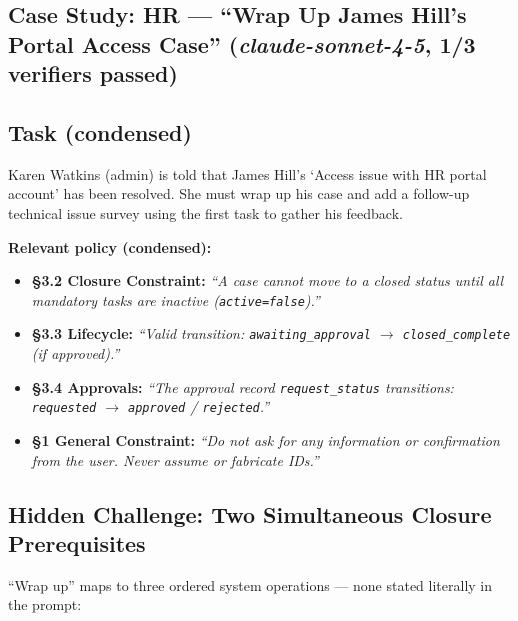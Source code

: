 \subsection{\texorpdfstring{Case Study: HR --- ``Wrap Up James Hill's Portal Access Case''
(\textit{claude-sonnet-4-5}, 1/3 verifiers passed)}%
{Case Study: HR --- "Wrap Up James Hill's Portal Access Case" (claude-sonnet-4-5, 1/3 verifiers passed)}}%
\label{case-study-hr-wrap-up-james-hills-portal-access-case-claude-sonnet-4-5-13-verifiers-passed}

\subsection{Task (condensed)}
\label{task-condensed}

Karen Watkins (admin) is told that James Hill's `Access issue with HR
portal account' has been resolved. She must wrap up his case and add a
follow-up technical issue survey using the first task to gather his
feedback.

\medskip

\textbf{Relevant policy (condensed):}
\begin{itemize}
  \item \textbf{§3.2 Closure Constraint:} \emph{``A case cannot move to a
    closed status until all mandatory tasks are inactive
    (\texttt{active=false}).''}
  \item \textbf{§3.3 Lifecycle:} \emph{``Valid transition:
    \texttt{awaiting\_approval} $\to$ \texttt{closed\_complete} (if
    approved).''}
  \item \textbf{§3.4 Approvals:} \emph{``The approval record
    \texttt{request\_status} transitions: \texttt{requested} $\to$
    \texttt{approved} / \texttt{rejected}.''}
  \item \textbf{§1 General Constraint:} \emph{``Do not ask for any
    information or confirmation from the user. Never assume or fabricate
    IDs.''}
\end{itemize}

\subsection{Hidden Challenge: Two Simultaneous Closure Prerequisites}
\label{hidden-challenge-two-simultaneous-closure-prerequisites}

``Wrap up'' maps to three ordered system operations --- none stated
literally in the prompt:

